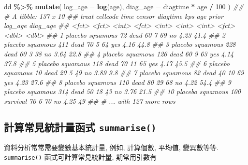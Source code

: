 \documentclass[
]{book}
\newenvironment{Shaded}{\begin{snugshade}}{\end{snugshade}}
\newcommand{\CommentTok}[1]{\textcolor[rgb]{0.56,0.35,0.01}{\textit{#1}}}
\newcommand{\DataTypeTok}[1]{\textcolor[rgb]{0.13,0.29,0.53}{#1}}
\newcommand{\DecValTok}[1]{\textcolor[rgb]{0.00,0.00,0.81}{#1}}
\newcommand{\KeywordTok}[1]{\textcolor[rgb]{0.13,0.29,0.53}{\textbf{#1}}}
\newcommand{\NormalTok}[1]{#1}
\newcommand{\OperatorTok}[1]{\textcolor[rgb]{0.81,0.36,0.00}{\textbf{#1}}}
\newcommand{\StringTok}[1]{\textcolor[rgb]{0.31,0.60,0.02}{#1}}
\begin{document}
\begin{Shaded}
\begin{Highlighting}[]
\NormalTok{dd }\OperatorTok{\%\textgreater{}\%}\StringTok{ }
\StringTok{  }\KeywordTok{mutate}\NormalTok{(}
    \DataTypeTok{log\_age =} \KeywordTok{log}\NormalTok{(age),}
    \DataTypeTok{diag\_age =}\NormalTok{ diagtime }\OperatorTok{*}\StringTok{ }\NormalTok{age }\OperatorTok{/}\StringTok{ }\DecValTok{100}
\NormalTok{    )}
\CommentTok{\#\# \# A tibble: 137 x 10}
\CommentTok{\#\#    treat   cellcode  time censor   diagtime   kps   age prior log\_age diag\_age}
\CommentTok{\#\#    \textless{}fct\textgreater{}   \textless{}fct\textgreater{}    \textless{}int\textgreater{} \textless{}fct\textgreater{}       \textless{}int\textgreater{} \textless{}int\textgreater{} \textless{}int\textgreater{} \textless{}fct\textgreater{}   \textless{}dbl\textgreater{}    \textless{}dbl\textgreater{}}
\CommentTok{\#\#  1 placebo squamous    72 dead           60     7    69 no       4.23     41.4}
\CommentTok{\#\#  2 placebo squamous   411 dead           70     5    64 yes      4.16     44.8}
\CommentTok{\#\#  3 placebo squamous   228 dead           60     3    38 no       3.64     22.8}
\CommentTok{\#\#  4 placebo squamous   126 dead           60     9    63 yes      4.14     37.8}
\CommentTok{\#\#  5 placebo squamous   118 dead           70    11    65 yes      4.17     45.5}
\CommentTok{\#\#  6 placebo squamous    10 dead           20     5    49 no       3.89      9.8}
\CommentTok{\#\#  7 placebo squamous    82 dead           40    10    69 yes      4.23     27.6}
\CommentTok{\#\#  8 placebo squamous   110 dead           80    29    68 no       4.22     54.4}
\CommentTok{\#\#  9 placebo squamous   314 dead           50    18    43 no       3.76     21.5}
\CommentTok{\#\# 10 placebo squamous   100 survival       70     6    70 no       4.25     49  }
\CommentTok{\#\# \# ... with 127 more rows}
\end{Highlighting}
\end{Shaded}

\hypertarget{ux8a08ux7b97ux5e38ux898bux7d71ux8a08ux91cfux51fdux5f0f-summarise}{%
\subsection{\texorpdfstring{計算常見統計量函式 \texttt{summarise()}}{計算常見統計量函式 summarise()}}\label{ux8a08ux7b97ux5e38ux898bux7d71ux8a08ux91cfux51fdux5f0f-summarise}}

資料分析常常需要變數基本統計量,
例如, 計算個數, 平均值, 變異數等等.
\texttt{summarise()} 函式可計算常見統計量,
期常用引數有
\end{document}
